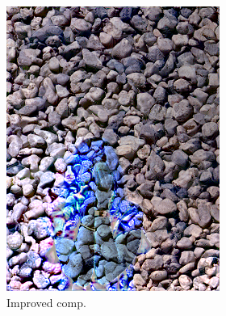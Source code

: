 \begin{figure}[]
\begin{subfigure}{\textwidth}
        \begin{subfigure}{0.24\textwidth}
            \centering
            \includegraphics[width=\textwidth]{images/04-experiment02/human/pebbles/improved_im.jpg}
            \caption*{Improved comp.}
        \end{subfigure}
        \hfill
        \begin{subfigure}{0.24\textwidth}
            \centering

\end{subfigure}
\end{subfigure}
\end{figure}
